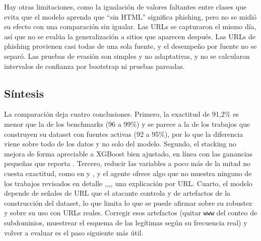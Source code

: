 Hay otras limitaciones, como la igualación de valores faltantes entre clases que evita que el modelo aprenda que ``sin HTML'' significa phishing, pero no se midió su efecto con una comparación sin igualar. Las URLs se capturaron el mismo día, así que no se evalúa la generalización a sitios que aparecen después. Las URLs de phishing provienen casi todas de una sola fuente, y el desempeño por fuente no se separó. Las pruebas de evasión son simples y no adaptativas, y no se calcularon intervalos de confianza por bootstrap ni pruebas pareadas.

\subsection{Síntesis}

La comparación deja cuatro conclusiones. Primero, la exactitud de 91,2\% es menor que la de los benchmarks (96 a 99\%) y se parece a la de los trabajos que construyen su dataset con fuentes activas (92 a 95\%), por lo que la diferencia viene sobre todo de los datos y no solo del modelo. Segundo, el stacking no mejora de forma apreciable a XGBoost bien ajustado, en línea con las ganancias pequeñas que reporta \cite{kalabarige2023boosting}. Tercero, reducir las variables a poco más de la mitad no cuesta exactitud, como en \cite{kalabarige2023boosting} y \cite{chiew2019hybrid}, y el agente ofrece algo que no muestra ninguno de los trabajos revisados en detalle \cite{kalabarige2022multilayer},\cite{kalabarige2023boosting},\cite{alsariera2020ai},\cite{duy2024study}, una explicación por URL. Cuarto, el modelo depende de señales de URL que el atacante controla y de artefactos de la construcción del dataset, lo que limita lo que se puede afirmar sobre su robustez y sobre su uso con URLs reales. Corregir esos artefactos (quitar \texttt{www} del conteo de subdominios, muestrear el esquema de las legítimas según su frecuencia real) y volver a evaluar es el paso siguiente más útil.